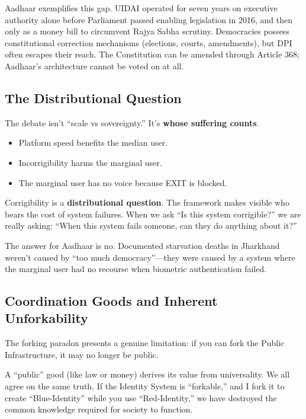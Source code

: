 Aadhaar exemplifies this gap. UIDAI operated for seven years on executive authority alone before Parliament passed enabling legislation in 2016, and then only as a money bill to circumvent Rajya Sabha scrutiny. Democracies possess constitutional correction mechanisms (elections, courts, amendments), but DPI often escapes their reach. The Constitution can be amended through Article 368; Aadhaar's architecture cannot be voted on at all.

\subsection{The Distributional Question}
\label{subsec:distributional}

The debate isn't ``scale vs sovereignty.'' It's \textbf{whose suffering counts}.

\begin{itemize}
    \item Platform speed benefits the median user.
    \item Incorrigibility harms the marginal user.
    \item The marginal user has no voice because EXIT is blocked.
\end{itemize}

Corrigibility is a \textbf{distributional question}. The framework makes visible who bears the cost of system failures. When we ask ``Is this system corrigible?'' we are really asking: ``When this system fails someone, can they do anything about it?''

The answer for Aadhaar is no. Documented starvation deaths in Jharkhand weren't caused by ``too much democracy''---they were caused by a system where the marginal user had no recourse when biometric authentication failed.

\subsection{Coordination Goods and Inherent Unforkability}
\label{subsec:coordination}

The forking paradox presents a genuine limitation: if you can fork the Public Infrastructure, it may no longer be public.

A ``public'' good (like law or money) derives its value from universality. We all agree on the same truth. If the Identity System is ``forkable,'' and I fork it to create ``Blue-Identity'' while you use ``Red-Identity,'' we have destroyed the common knowledge required for society to function.

